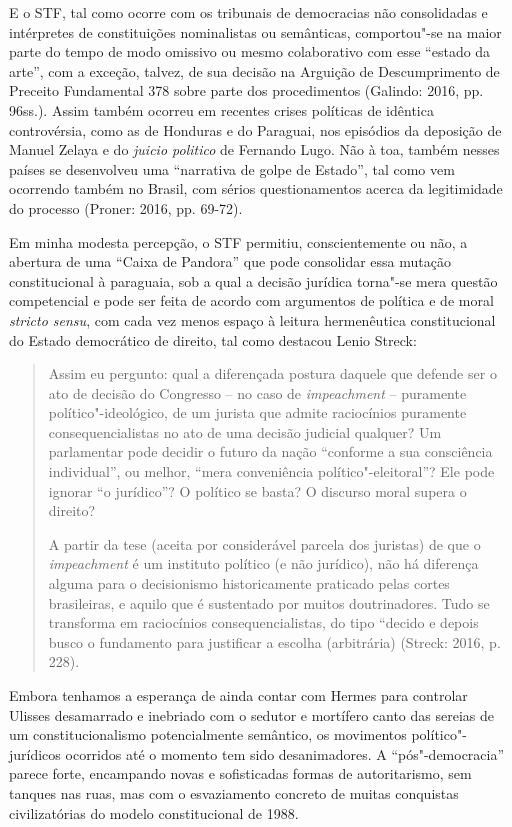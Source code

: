 E o STF, tal como ocorre com os tribunais de democracias não
consolidadas e intérpretes de constituições nominalistas ou semânticas,
comportou"-se na maior parte do tempo de modo omissivo ou mesmo
colaborativo com esse ``estado da arte'', com a exceção, talvez, de sua
decisão na Arguição de Descumprimento de Preceito Fundamental 378 sobre
parte dos procedimentos (Galindo: 2016, pp. 96ss.). Assim também ocorreu
em recentes crises políticas de idêntica controvérsia, como as de
Honduras e do Paraguai, nos episódios da deposição de Manuel Zelaya e do
\emph{juicio politico} de Fernando Lugo. Não à toa, também nesses países
se desenvolveu uma ``narrativa de golpe de Estado'', tal como vem
ocorrendo também no Brasil, com sérios questionamentos acerca da
legitimidade do processo (Proner: 2016, pp. 69-72).

Em minha modesta percepção, o STF permitiu, conscientemente ou não, a
abertura de uma ``Caixa de Pandora'' que pode consolidar essa mutação
constitucional à paraguaia, sob a qual a decisão jurídica torna"-se mera
questão competencial e pode ser feita de acordo com argumentos de
política e de moral \emph{stricto sensu}, com cada vez menos espaço à
leitura hermenêutica constitucional do Estado democrático de direito,
tal como destacou Lenio Streck:

\begin{quote}
Assim eu pergunto: qual a diferençada postura daquele que defende ser o
ato de decisão do Congresso -- no caso de \emph{impeachment} --
puramente político"-ideológico, de um jurista que admite raciocínios
puramente consequencialistas no ato de uma decisão judicial qualquer? Um
parlamentar pode decidir o futuro da nação ``conforme a sua consciência
individual'', ou melhor, ``mera conveniência político"-eleitoral''? Ele
pode ignorar ``o jurídico''? O político se basta? O discurso moral
supera o direito?

A partir da tese (aceita por considerável parcela dos juristas) de que o
\emph{impeachment} é um instituto político (e não jurídico), não há
diferença alguma para o decisionismo historicamente praticado pelas
cortes brasileiras, e aquilo que é sustentado por muitos doutrinadores.
Tudo se transforma em raciocínios consequencialistas, do tipo ``decido e
depois busco o fundamento para justificar a escolha (arbitrária)
(Streck: 2016, p. 228).
\end{quote}

Embora tenhamos a esperança de ainda contar com Hermes para controlar
Ulisses desamarrado e inebriado com o sedutor e mortífero canto das
sereias de um constitucionalismo potencialmente semântico, os movimentos
político"-jurídicos ocorridos até o momento tem sido desanimadores. A
``pós"-democracia'' parece forte, encampando novas e sofisticadas formas
de autoritarismo, sem tanques nas ruas, mas com o esvaziamento concreto
de muitas conquistas civilizatórias do modelo constitucional de 1988.

